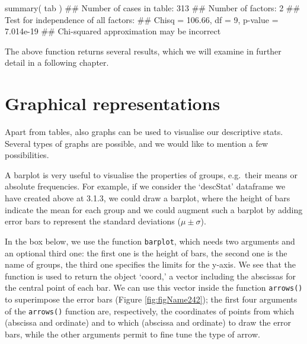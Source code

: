 \documentclass[a4paper,12pt,oneside]{book}
\newenvironment{Shaded}{\begin{snugshade}}{\end{snugshade}}
\newcommand{\DocumentationTok}[1]{#1}
\newcommand{\FunctionTok}[1]{#1}
\newcommand{\NormalTok}[1]{#1}
\begin{document}
\begin{Shaded}
\begin{Highlighting}[]
\FunctionTok{summary}\NormalTok{( tab )}
\DocumentationTok{\#\# Number of cases in table: 313 }
\DocumentationTok{\#\# Number of factors: 2 }
\DocumentationTok{\#\# Test for independence of all factors:}
\DocumentationTok{\#\#  Chisq = 106.66, df = 9, p{-}value = 7.014e{-}19}
\DocumentationTok{\#\#  Chi{-}squared approximation may be incorrect}
\end{Highlighting}
\end{Shaded}

The above function returns several results, which we will examine in further detail in a following chapter.

\hypertarget{graphical-representations}{%
\section{Graphical representations}\label{graphical-representations}}

Apart from tables, also graphs can be used to visualise our descriptive stats. Several types of graphs are possible, and we would like to mention a few possibilities.

A barplot is very useful to visualise the properties of groups, e.g.~their means or absolute frequencies. For example, if we consider the `descStat' dataframe we have created above at 3.1.3, we could draw a barplot, where the height of bars indicate the mean for each group and we could augment such a barplot by adding error bars to represent the standard deviations (\(\mu \pm \sigma\)).

In the box below, we use the function \texttt{barplot}, which needs two arguments and an optional third one: the first one is the height of bars, the second one is the name of groups, the third one specifies the limits for the y-axis. We see that the function is used to return the object `coord,' a vector including the abscissas for the central point of each bar. We can use this vector inside the function \texttt{arrows()} to superimpose the error bars (Figure \ref{fig:figName242}); the first four arguments of the \texttt{arrows()} function are, respectively, the coordinates of points from which (abscissa and ordinate) and to which (abscissa and ordinate) to draw the error bars, while the other arguments permit to fine tune the type of arrow.
\end{document}
